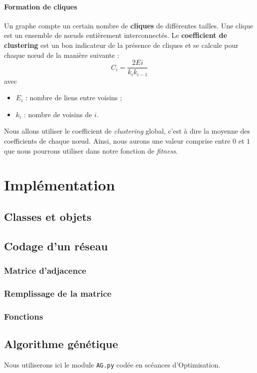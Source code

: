 \paragraph*{Formation de cliques\\}

Un graphe compte un certain nombre de \textbf{cliques} de différentes tailles. Une clique est un ensemble de nœuds entièrement interconnectés. Le \textbf{coefficient de clustering} est un bon indicateur de la présence de cliques et se calcule pour chaque nœud de la manière suivante :
$$ C_i = \frac{2Ei}{k_i k_{i-1}} $$
avec
\begin{itemize}
 \item $E_i$ : nombre de liens entre voisins ;
 \item $k_i$ : nombre de voisins de $i$.
\end{itemize}
Nous allons utiliser le coefficient de \textit{clustering} global, c'est à dire la moyenne des coefficients de chaque nœud. Ainsi, nous aurons une valeur comprise entre $0$ et $1$ que nous pourrons utiliser dans notre fonction de \textit{fitness}.



\section{Implémentation}

\subsection{Classes et objets}

\subsection{Codage d'un réseau}
\subsubsection{Matrice d'adjacence}
\subsubsection{Remplissage de la matrice}
\subsubsection{Fonctions}

\subsection{Algorithme génétique}
Nous utiliserons ici le module \texttt{AG.py} codée en scéances d'Optimisation. 

